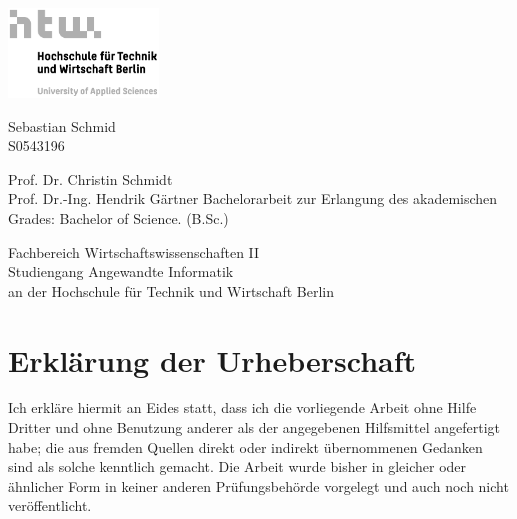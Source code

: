 

\begin{titlepage}
    \begin{addmargin}[4cm]{-1cm}
        \centering
        \hfill\includegraphics[width=4cm]{pix/S07_HTW_Berlin_Logo_pos_GRAU_RGB.jpg}\par
        \vspace{4\baselineskip}
        {\Huge 
        \par}
        \vspace{4\baselineskip}
    
        \par
        {\Large Sebastian Schmid \\ S0543196 \par}
        \vfill
        {Prof. Dr. Christin Schmidt \\ Prof. Dr.-Ing. Hendrik Gärtner} 
        \vfill
        Bachelorarbeit zur Erlangung des akademischen Grades: Bachelor of Science. (B.Sc.)\par
        {Fachbereich Wirtschaftswissenschaften II \\ Studiengang Angewandte Informatik \\ an der Hochschule für Technik und Wirtschaft Berlin}
    \end{addmargin}
\end{titlepage}

\newpage

\section*{Erklärung der Urheberschaft}\thispagestyle{empty}

Ich erkläre hiermit an Eides statt, dass ich die vorliegende Arbeit
ohne Hilfe Dritter und ohne Benutzung anderer als der angegebenen
Hilfsmittel angefertigt habe; die aus fremden Quellen direkt oder
indirekt übernommenen Gedanken sind als solche kenntlich gemacht. Die
Arbeit wurde bisher in gleicher oder ähnlicher Form in keiner anderen
Prüfungsbehörde vorgelegt und auch noch nicht veröffentlicht.


